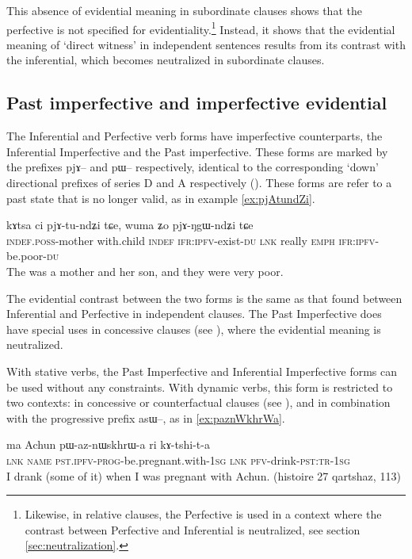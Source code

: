 \documentclass[oldfontcommands,oneside,a4paper,11pt]{article}
\newcommand{\ipa}[1]{{\phon \mbox{#1}}} %
\begin{document}
This absence of evidential meaning in subordinate clauses shows that the perfective is not specified for evidentiality.\footnote{Likewise, in relative clauses, the Perfective is used in a context where the contrast between Perfective and Inferential is neutralized, see section \ref{sec:neutralization}.} Instead, it shows that the evidential meaning of `direct witness' in independent sentences results from its contrast with the inferential, which becomes neutralized in subordinate clauses.


\subsection{Past imperfective and imperfective evidential}  \label{sec:pst:ipfv}
The Inferential and Perfective verb forms have imperfective counterparts, the Inferential Imperfective and the  Past imperfective. These forms are marked by the prefixes \ipa{pjɤ--} and \ipa{pɯ--} respectively, identical to the 
corresponding `down' directional prefixes of series D and A respectively (\citealt{lin11direction}). These forms are refer to a past state that is no longer valid, as in example \ref{ex:pjAtundZi}. 

\begin{exe}
\ex \label{ex:pjAtundZi}
\gll  \ipa{tɤ-mu} 	\ipa{kɤtsa} 	\ipa{ci} 	\ipa{pjɤ-tu-ndʑi} 	\ipa{tɕe,} 	\ipa{wuma} 	\ipa{ʑo} 	\ipa{pjɤ-ŋgɯ-ndʑi} 	\ipa{tɕe}  \\
\textsc{indef.poss}-mother with.child \textsc{indef} \textsc{ifr:ipfv}-exist-\textsc{du} \textsc{lnk} really \textsc{emph}  \textsc{ifr:ipfv}-be.poor-\textsc{du} \\
\glt The was a mother and her son, and they were very poor.
\end{exe}

The evidential contrast between the two forms is the same as that found between Inferential and Perfective in independent clauses. The Past Imperfective does have special uses in concessive clauses (see \citealt[298]{jacques14linking}), where the evidential meaning is neutralized.

With stative verbs, the Past Imperfective and Inferential Imperfective forms can be used without any constraints. With dynamic verbs, this form is restricted to two contexts: in concessive or counterfactual clauses (see \citealt[298]{jacques14linking}), and in combination with the progressive prefix \ipa{asɯ--}, as in \ref{ex:paznWkhrWa}.

\begin{exe}
\ex \label{ex:paznWkhrWa}
\gll 
\ipa{ma} 	Achun 	\ipa{pɯ-az-nɯskhrɯ-a} 	\ipa{ri} 	\ipa{kɤ-tshi-t-a} \\
\textsc{lnk} \textsc{name} \textsc{pst.ipfv-prog}-be.pregnant.with-\textsc{1sg} \textsc{lnk} \textsc{pfv}-drink-\textsc{pst:tr-1sg} \\
\glt I drank (some of it) when I was pregnant with Achun. (histoire 27 qartshaz, 113)
\end{exe}
\end{document}
